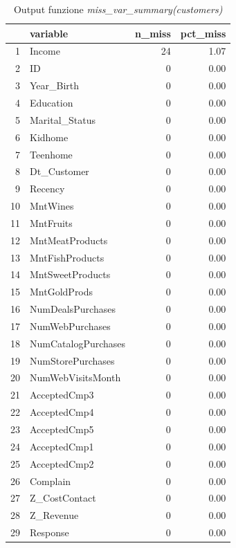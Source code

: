 \documentclass[letterpaper,11pt]{article}
\begin{document}
\begin{table}[h!t]
\centering
\begin{tabular}{rlrr}
  \hline
 & variable & n\_miss & pct\_miss \\ 
  \hline
1 & Income &  24 & 1.07 \\ 
  2 & ID &   0 & 0.00 \\ 
  3 & Year\_Birth &   0 & 0.00 \\ 
  4 & Education &   0 & 0.00 \\ 
  5 & Marital\_Status &   0 & 0.00 \\ 
  6 & Kidhome &   0 & 0.00 \\ 
  7 & Teenhome &   0 & 0.00 \\ 
  8 & Dt\_Customer &   0 & 0.00 \\ 
  9 & Recency &   0 & 0.00 \\ 
  10 & MntWines &   0 & 0.00 \\ 
  11 & MntFruits &   0 & 0.00 \\ 
  12 & MntMeatProducts &   0 & 0.00 \\ 
  13 & MntFishProducts &   0 & 0.00 \\ 
  14 & MntSweetProducts &   0 & 0.00 \\ 
  15 & MntGoldProds &   0 & 0.00 \\ 
  16 & NumDealsPurchases &   0 & 0.00 \\ 
  17 & NumWebPurchases &   0 & 0.00 \\ 
  18 & NumCatalogPurchases &   0 & 0.00 \\ 
  19 & NumStorePurchases &   0 & 0.00 \\ 
  20 & NumWebVisitsMonth &   0 & 0.00 \\ 
  21 & AcceptedCmp3 &   0 & 0.00 \\ 
  22 & AcceptedCmp4 &   0 & 0.00 \\ 
  23 & AcceptedCmp5 &   0 & 0.00 \\ 
  24 & AcceptedCmp1 &   0 & 0.00 \\ 
  25 & AcceptedCmp2 &   0 & 0.00 \\ 
  26 & Complain &   0 & 0.00 \\ 
  27 & Z\_CostContact &   0 & 0.00 \\ 
  28 & Z\_Revenue &   0 & 0.00 \\ 
  29 & Response &   0 & 0.00 \\ 
   \hline
\end{tabular}

    \caption{Output funzione \textit{miss\_var\_summary(customers)}}
   
   \label{fig:miss_var_summary(customers)}
\end{table}
\end{document}
